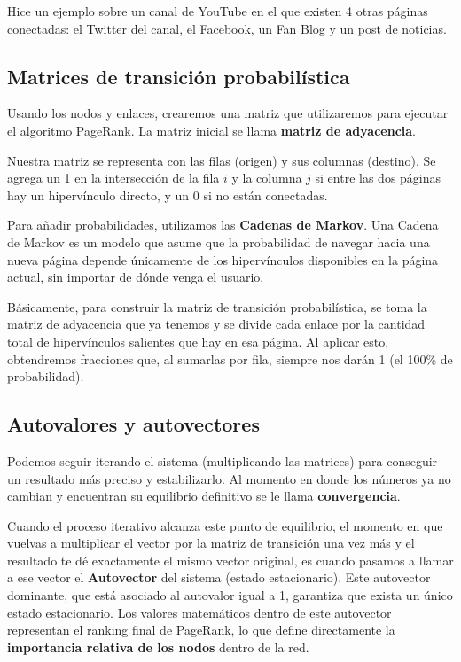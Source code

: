 \documentclass[12pt,letterpaper]{article}
\begin{document}
Hice un ejemplo sobre un canal de YouTube en el que existen 4 otras páginas conectadas: el Twitter del canal, el Facebook, un Fan Blog y un post de noticias.

\subsection{Matrices de transición probabilística}
Usando los nodos y enlaces, crearemos una matriz que utilizaremos para ejecutar el algoritmo PageRank. La matriz inicial se llama \textbf{matriz de adyacencia}.

Nuestra matriz se representa con las filas (origen) y sus columnas (destino). Se agrega un 1 en la intersección de la fila $i$ y la columna $j$ si entre las dos páginas hay un hipervínculo directo, y un 0 si no están conectadas.

Para añadir probabilidades, utilizamos las \textbf{Cadenas de Markov}. Una Cadena de Markov es un modelo que asume que la probabilidad de navegar hacia una nueva página depende únicamente de los hipervínculos disponibles en la página actual, sin importar de dónde venga el usuario.

Básicamente, para construir la matriz de transición probabilística, se toma la matriz de adyacencia que ya tenemos y se divide cada enlace por la cantidad total de hipervínculos salientes que hay en esa página. Al aplicar esto, obtendremos fracciones que, al sumarlas por fila, siempre nos darán 1 (el 100\% de probabilidad).

\subsection{Autovalores y autovectores}
Podemos seguir iterando el sistema (multiplicando las matrices) para conseguir un resultado más preciso y estabilizarlo. Al momento en donde los números ya no cambian y encuentran su equilibrio definitivo se le llama \textbf{convergencia}.

Cuando el proceso iterativo alcanza este punto de equilibrio, el momento en que vuelvas a multiplicar el vector por la matriz de transición una vez más y el resultado te dé exactamente el mismo vector original, es cuando pasamos a llamar a ese vector el \textbf{Autovector} del sistema (estado estacionario). Este autovector dominante, que está asociado al autovalor igual a 1, garantiza que exista un único estado estacionario. Los valores matemáticos dentro de este autovector representan el ranking final de PageRank, lo que define directamente la \textbf{importancia relativa de los nodos} dentro de la red.
\end{document}
